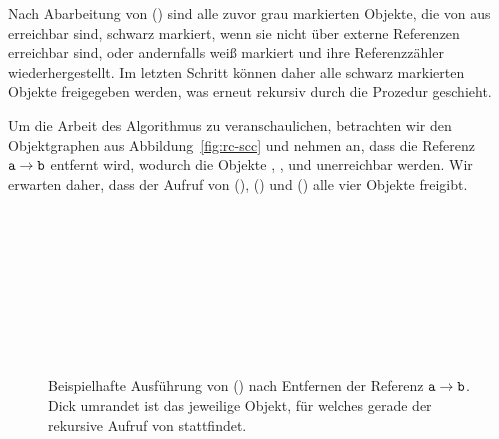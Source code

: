 Nach Abarbeitung von () sind alle zuvor grau markierten Objekte, die von  aus erreichbar sind, schwarz markiert, wenn sie nicht über externe Referenzen erreichbar sind, oder andernfalls weiß markiert und ihre Referenzzähler wiederhergestellt.
Im letzten Schritt können daher alle schwarz markierten Objekte freigegeben werden, was erneut rekursiv durch die Prozedur  geschieht.

Um die Arbeit des Algorithmus zu veranschaulichen, betrachten wir den Objektgraphen aus Abbildung~\ref{fig:rc-scc} und nehmen an, dass die Referenz $\texttt{a} \rightarrow \texttt{b}$ entfernt wird, wodurch die Objekte , ,  und  unerreichbar werden.
Wir erwarten daher, dass der Aufruf von (), () und () alle vier Objekte freigibt.

\begin{figure}[h]
	\centering
	\begin{subfigure}{0.4\textwidth}
		\centering
		
	\end{subfigure}~\hspace{0.5cm}~
	\begin{subfigure}{0.473\textwidth}
		\centering
		
	\end{subfigure}\\[1cm]
	\begin{subfigure}{0.4\textwidth}
		\centering
		
	\end{subfigure}~\hspace{0.5cm}~
	\begin{subfigure}{0.4\textwidth}
		\centering
		
	\end{subfigure}\\[1cm]
	\begin{subfigure}{0.4\textwidth}
		\centering
		
	\end{subfigure}~\hspace{0.5cm}~
	\begin{subfigure}{0.4\textwidth}
		\centering
		
	\end{subfigure}
	\caption[Ausführung von ()]{Beispielhafte Ausführung von () nach Entfernen der Referenz $\texttt{a} \rightarrow \texttt{b}$. Dick umrandet ist das jeweilige Objekt, für welches gerade der rekursive Aufruf von  stattfindet.}
	\label{fig:rc-markgray-example}
\end{figure}

